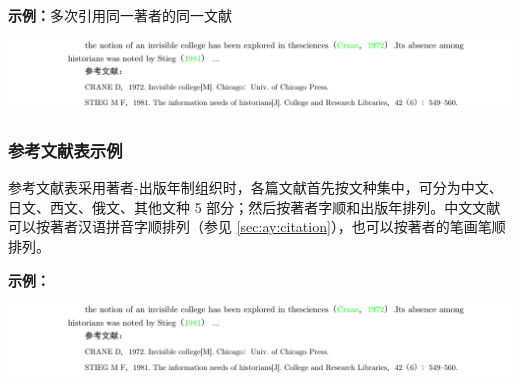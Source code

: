 \documentclass[twoside]{article}%
\begin{document}
\textbf{示例：}多次引用同一著者的同一文献

\noindent\hspace{-2.5cm}\includegraphics[width=\paperwidth,page=4]{tngbcitationaynew.pdf}

%
%
%
%
%


\subsubsection{参考文献表示例}

参考文献表采用著者-出版年制组织时，各篇文献首先按文种集中，可分为中文、日文、西文、俄文、其他文种 5 部分；然后按著者字顺和出版年排列。中文文献可以按著者汉语拼音字顺排列（参见 \ref{sec:ay:citation}），也可以按著者的笔画笔顺排列。

\textbf{示例：}

\noindent\hspace{-2.5cm}\includegraphics[width=\paperwidth,page=5]{tngbcitationaynew.pdf}
%
%
%
\end{document}
